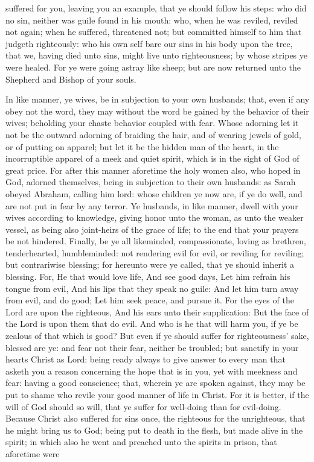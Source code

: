 suffered for you, leaving you an example, that ye should follow his steps: who did no sin, neither was guile found in his mouth: who, when he was reviled, reviled not again; when he suffered, threatened not; but committed himself to him that judgeth righteously: who his own self bare our sins in his body upon the tree, that we, having died unto sins, might live unto righteousness; by whose stripes ye were healed. For ye were going astray like sheep; but are now returned unto the Shepherd and Bishop of your souls. 

In like manner, ye wives, be in subjection to your own husbands; that, even if any obey not the word, they may without the word be gained by the behavior of their wives; beholding your chaste behavior coupled with fear. Whose adorning let it not be the outward adorning of braiding the hair, and of wearing jewels of gold, or of putting on apparel; but let it be the hidden man of the heart, in the incorruptible apparel of a meek and quiet spirit, which is in the sight of God of great price. For after this manner aforetime the holy women also, who hoped in God, adorned themselves, being in subjection to their own husbands: as Sarah obeyed Abraham, calling him lord: whose children ye now are, if ye do well, and are not put in fear by any terror.  Ye husbands, in like manner, dwell with your wives according to knowledge, giving honor unto the woman, as unto the weaker vessel, as being also joint-heirs of the grace of life; to the end that your prayers be not hindered.  Finally, be ye all likeminded, compassionate, loving as brethren, tenderhearted, humbleminded: not rendering evil for evil, or reviling for reviling; but contrariwise blessing; for hereunto were ye called, that ye should inherit a blessing. For, He that would love life, And see good days, Let him refrain his tongue from evil, And his lips that they speak no guile:  And let him turn away from evil, and do good; Let him seek peace, and pursue it.  For the eyes of the Lord are upon the righteous, And his ears unto their supplication: But the face of the Lord is upon them that do evil.  And who is he that will harm you, if ye be zealous of that which is good? But even if ye should suffer for righteousness’ sake, blessed are ye: and fear not their fear, neither be troubled; but sanctify in your hearts Christ as Lord: being ready always to give answer to every man that asketh you a reason concerning the hope that is in you, yet with meekness and fear: having a good conscience; that, wherein ye are spoken against, they may be put to shame who revile your good manner of life in Christ. For it is better, if the will of God should so will, that ye suffer for well-doing than for evil-doing. Because Christ also suffered for sins once, the righteous for the unrighteous, that he might bring us to God; being put to death in the flesh, but made alive in the spirit; in which also he went and preached unto the spirits in prison, that aforetime were 